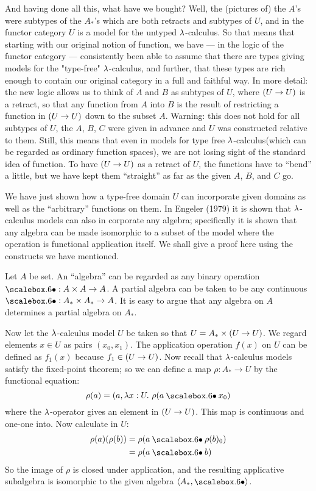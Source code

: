And having done all this, what have we bought? Well, the (pictures of) the $A$'s were subtypes of the $A_*$'s which are both retracts and subtypes of $U$, and in the functor category $U$ is a model for the untyped $\lambda$-calculus. So that means that starting with our original notion of function, we have --- in the logic of the functor category --- consistently been able to assume that there are types giving models for the "type-free" $\lambda$-calculus,
and further, that these types are rich enough to contain our original category in a full and faithful way. In more detail: the new logic allows us to think of $A$ and $B$ as subtypes of $U$, where $(U\rightarrow U)$ is a retract, so that any function from $A$ into $B$ is the result of restricting a function in $(U\rightarrow U)$ down to the subset $A$. Warning: this does not hold for all subtypes of $U$, the $A$, $B$, $C$ were given in advance and $U$ was constructed rela­tive to them. Still, this means that even in models for type­ free $\lambda$-calculus(which can be regarded as ordinary function spaces), we are not losing sight of the standard idea of func­tion. To have $(U\rightarrow U)$ as a retract of $U$, the functions have to ``bend'' a little, but we have kept them ``straight'' as far as the given $A$, $B$, and $C$ go.

We have just shown how a type-free domain $U$ can incorporate given domains as well as the ``arbitrary'' functions on them. In Engeler (1979) it is shown that $\lambda$-calculus models can also in­ corporate any algebra; specifically it is shown that any alge­bra can be made isomorphic to a subset of the model where the operation is functional application itself. We shall give a proof here using the constructs we have mentioned.

Let $A$ be set. An ``algebra'' can be regarded as any binary operation $\dotop : A\times A\to A$. 
A partial algebra can be taken to be any continuous $\dotop : A_* \times A_* \to A$.
It is easy to argue that any algebra on $A$ determines a partial algebra on $A_*$.

Now let the $\lambda$-calculus model $U$ be taken so that
$U = A_* \times  (U\rightarrow U)$. We regard elements $x \in U$ as pairs $(x_0 , x_1 )$.
The application operation $f(x)$ on $U$ can be defined as $f_1(x)$ be­cause $f_1 \in (U\rightarrow U)$. Now recall that $\lambda$-calculus models satisfy
the fixed-point theorem; so we can define a map $\rho: A_*\to U$ by the functional equation:
$$
\rho(a)  =  (a, \l x: U. \,\,\rho (a \dotop x_0)
$$
where the $\lambda$-operator gives an element in $(U\rightarrow U)$. This map is continuous and one-one into. Now calculate in $U$:
\begin{align*}
\rho(a)(\rho(b)) &= \rho(a\dotop \rho(b)_0)\\
&= \rho( a  \dotop  b)
\end{align*}
So the image of $\rho$ is closed under application, and the result­ing applicative subalgebra is isomorphic to the given algebra
$\langle A_*, \dotop \rangle$. 

